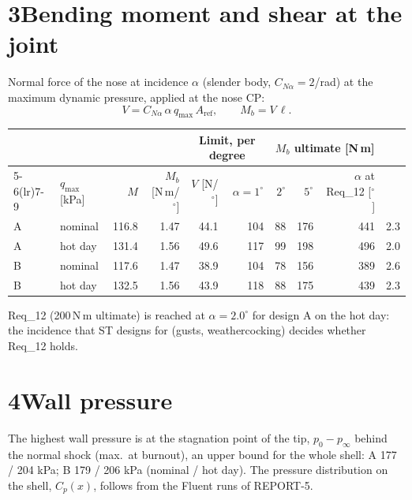 \documentclass[10pt,a4paper]{article}
\begin{document}
\section*{3\quad Bending moment and shear at the joint}
Normal force of the nose at incidence $\alpha$ (slender body, $C_{N\alpha} = 2$/rad) at the maximum
dynamic pressure, applied at the nose CP:
\[
V = C_{N\alpha}\,\alpha\, q_\mathrm{max}\, A_\mathrm{ref}, \qquad M_b = V\,\ell .
\]
\begin{center}\small
\begin{tabular}{@{}llrrrrrrrr@{}}
\toprule
& & & & \multicolumn{2}{c}{Limit, per degree} & \multicolumn{3}{c}{$M_b$ ultimate [N\,m]} & \\
\cmidrule(lr){5-6}\cmidrule(lr){7-9}
\multicolumn{2}{@{}l}{Case} & $q_\mathrm{max}$ [kPa] & $M$ & $M_b$ [N\,m/$^\circ$] & $V$ [N/$^\circ$] &
$\alpha = 1^\circ$ & $2^\circ$ & $5^\circ$ & $\alpha$ at Req\_12 [$^\circ$]\\
\midrule
A & nominal & 116.8 & 1.47 & 44.1 & 104 & 88 & 176 & 441 & 2.3 \\
A & hot day & 131.4 & 1.56 & 49.6 & 117 & 99 & 198 & 496 & 2.0 \\
B & nominal & 117.6 & 1.47 & 38.9 & 104 & 78 & 156 & 389 & 2.6 \\
B & hot day & 132.5 & 1.56 & 43.9 & 118 & 88 & 175 & 439 & 2.3 \\
\bottomrule
\end{tabular}
\end{center}
Req\_12 (200\,N\,m ultimate) is reached at $\alpha = 2.0^\circ$ for design A on the hot day:
the incidence that ST designs for (gusts, weathercocking) decides whether Req\_12 holds.

\section*{4\quad Wall pressure}
The highest wall pressure is at the stagnation point of the tip, $p_0 - p_\infty$ behind the normal
shock (max.\ at burnout), an upper bound for the whole shell: A 177 / 204 kPa; B 179 / 206 kPa (nominal / hot day). The pressure distribution
on the shell, $C_p(x)$, follows from the Fluent runs of REPORT-5.
\end{document}
